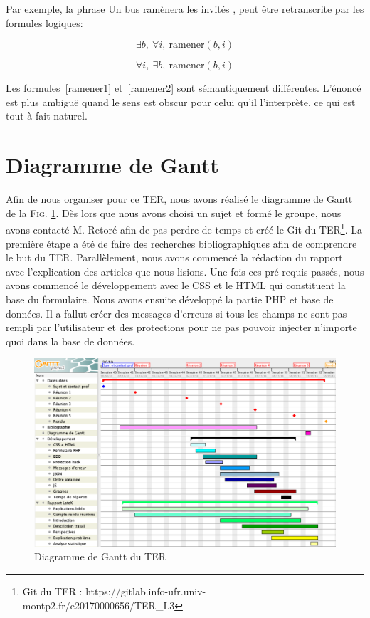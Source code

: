 \documentclass[11pt,letterpaper]{article}
\begin{document}
Par exemple, la phrase \og Un bus ramènera les invités \fg{}, peut être retranscrite par les formules logiques: 

\begin{equation}
\exists b,~\forall i,~\text{ramener}(b,i)
\label{ramener1}
\end{equation}

\vspace{-17px}

\begin{equation}
\forall i,~\exists b,~\text{ramener}(b,i)
\label{ramener2}
\end{equation}

Les formules~\eqref{ramener1} et~\eqref{ramener2} sont sémantiquement différentes. L'énoncé est plus ambiguë quand le sens est obscur pour celui qu'il l'interprète, ce qui est tout à fait naturel.
\newpage

\part{Diagramme de Gantt}

Afin de nous organiser pour ce TER, nous avons réalisé le diagramme de Gantt de la \textsc{Fig. }\ref{fig:gantt}. Dès lors que nous avons choisi un sujet et formé le groupe, nous avons contacté M. Retoré afin de pas perdre de temps et créé le Git du TER\footnote{Git du TER : https://gitlab.info-ufr.univ-montp2.fr/e20170000656/TER\_L3}. La première étape a été de faire des recherches bibliographiques afin de comprendre le but du TER. Parallèlement, nous avons commencé la rédaction du rapport avec l'explication des articles que nous lisions. Une fois ces pré-requis passés, nous avons commencé le développement avec le CSS et le HTML qui constituent la base du formulaire. Nous avons ensuite développé la partie PHP et base de données. Il a fallut créer des messages d'erreurs si tous les champs ne sont pas rempli par l'utilisateur et des protections pour ne pas pouvoir injecter n'importe quoi dans la base de données.

\vspace{10px}

\begin{figure}[htbp]
\begin{center}
\includegraphics[width=1\textwidth]{figures/gantt}
\caption{Diagramme de Gantt du TER}
\label{fig:gantt}
\end{center}
\end{figure}
\end{document}
